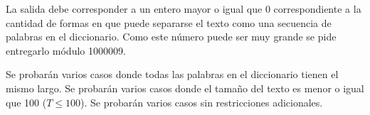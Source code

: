 \documentclass{oci}
\begin{document}
\begin{outputDescription}
  La salida debe corresponder a un entero mayor o igual que 0 correspondiente a
  la cantidad de formas en que puede separarse el texto como una secuencia de
  palabras en el diccionario.
  Como este número puede ser muy grande se pide entregarlo módulo 1000009.
\end{outputDescription}

\begin{scoreDescription}
   Se probarán varios casos donde todas las palabras en el diccionario
  tienen el mismo largo.
   Se probarán varios casos donde el tamaño del texto es menor o igual
  que 100 ($T \leq 100$).
   Se probarán varios casos sin restricciones adicionales.
\end{scoreDescription}

\begin{sampleDescription}
\end{sampleDescription}
\end{document}
